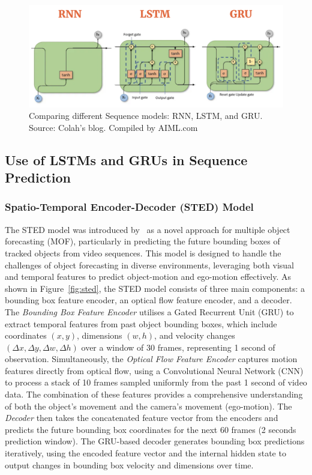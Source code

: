 \documentclass[12pt,oneside]{book} %
\begin{document}
\begin{figure}[H]
    \centering
    \includegraphics[width=1\textwidth]{figures/lstm-rnn-gru.png}
    \caption{Comparing different Sequence models: RNN, LSTM, and GRU. Source: Colah's blog. Compiled by AIML.com}\label{fig:lstm-rnn-gru}
\end{figure}

\newpage
\subsection*{Use of LSTMs and GRUs in Sequence Prediction}
\subsubsection*{Spatio-Temporal Encoder-Decoder (STED) Model}

The STED model was introduced by~\citet{MultipleObjectForecasting} as a novel
approach for multiple object forecasting (MOF), particularly in predicting the
future bounding boxes of tracked objects from video sequences. This model is
designed to handle the challenges of object forecasting in diverse
environments, leveraging both visual and temporal features to predict
object-motion and ego-motion effectively. As shown in Figure~\ref{fig:sted},
the STED model consists of three main components: a bounding box feature
encoder, an optical flow feature encoder, and a decoder. The \textit{Bounding
    Box Feature Encoder} utilises a Gated Recurrent Unit (GRU) to extract temporal
features from past object bounding boxes, which include coordinates $(x, y)$,
dimensions $(w, h)$, and velocity changes $(\Delta x, \Delta y, \Delta w,
    \Delta h)$ over a window of 30 frames, representing 1 second of observation.
Simultaneously, the \textit{Optical Flow Feature Encoder} captures motion
features directly from optical flow, using a Convolutional Neural Network (CNN)
to process a stack of 10 frames sampled uniformly from the past 1 second of
video data. The combination of these features provides a comprehensive
understanding of both the object's movement and the camera's movement
(ego-motion). The \textit{Decoder} then takes the concatenated feature vector
from the encoders and predicts the future bounding box coordinates for the next
60 frames (2 seconds prediction window). The GRU-based decoder generates
bounding box predictions iteratively, using the encoded feature vector and the
internal hidden state to output changes in bounding box velocity and dimensions
over time.
\end{document}
